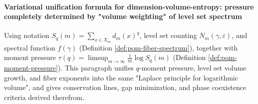 
\paragraph{Variational unification formula for dimension-volume-entropy: pressure completely determined by "volume weighting" of level set spectrum}
Using notation \(S_q(m)=\sum_{x\in X_m}d_m(x)^q\), level set counting \(N_m(\gamma,\varepsilon)\), and spectral function \(f(\gamma)\) (Definition \ref{def:pom-fiber-spectrum}), together with moment pressure
\(\tau(q)=\limsup_{m\to\infty}\frac1m\log S_q(m)\) (Definition \ref{def:pom-moment-pressure}).
This paragraph unifies \(q\)-moment pressure, level set volume growth, and fiber exponents into the same "Laplace principle for logarithmic volume", and gives conservation lines, gap minimization, and phase coexistence criteria derived therefrom.

